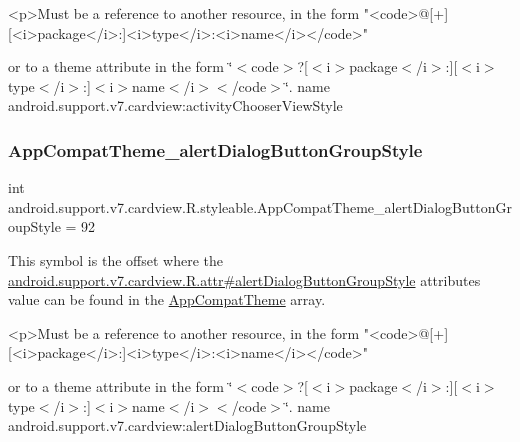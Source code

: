 \begin{DoxyVerb}      <p>Must be a reference to another resource, in the form "<code>@[+][<i>package</i>:]<i>type</i>:<i>name</i></code>"
\end{DoxyVerb}
 or to a theme attribute in the form \char`\"{}$<$code$>$?\mbox{[}$<$i$>$package$<$/i$>$\+:\mbox{]}\mbox{[}$<$i$>$type$<$/i$>$\+:\mbox{]}$<$i$>$name$<$/i$>$$<$/code$>$\char`\"{}.  name android.\+support.\+v7.\+cardview\+:activity\+Chooser\+View\+Style \mbox{\label{classandroid_1_1support_1_1v7_1_1cardview_1_1R_1_1styleable_ac3a18c29d8fce9bf5c1b142f1a07e531}} 
\subsubsection{\texorpdfstring{App\+Compat\+Theme\+\_\+alert\+Dialog\+Button\+Group\+Style}{AppCompatTheme\_alertDialogButtonGroupStyle}}
{\footnotesize\ttfamily int android.\+support.\+v7.\+cardview.\+R.\+styleable.\+App\+Compat\+Theme\+\_\+alert\+Dialog\+Button\+Group\+Style = 92\hspace{0.3cm}{\ttfamily [static]}}

This symbol is the offset where the \hyperlink{classandroid_1_1support_1_1v7_1_1cardview_1_1R_1_1attr_aa7a3375ee9b48d0c8df6ec49c72d5199}{android.\+support.\+v7.\+cardview.\+R.\+attr\#alert\+Dialog\+Button\+Group\+Style} attribute\textquotesingle{}s value can be found in the \hyperlink{classandroid_1_1support_1_1v7_1_1cardview_1_1R_1_1styleable_a52e6f69f954ecc2622d72c0b4d298938}{App\+Compat\+Theme} array.

\begin{DoxyVerb}      <p>Must be a reference to another resource, in the form "<code>@[+][<i>package</i>:]<i>type</i>:<i>name</i></code>"
\end{DoxyVerb}
 or to a theme attribute in the form \char`\"{}$<$code$>$?\mbox{[}$<$i$>$package$<$/i$>$\+:\mbox{]}\mbox{[}$<$i$>$type$<$/i$>$\+:\mbox{]}$<$i$>$name$<$/i$>$$<$/code$>$\char`\"{}.  name android.\+support.\+v7.\+cardview\+:alert\+Dialog\+Button\+Group\+Style \mbox{\label{classandroid_1_1support_1_1v7_1_1cardview_1_1R_1_1styleable_af83656dc4de3b9d3f32fcd07ff7b8892}} 
